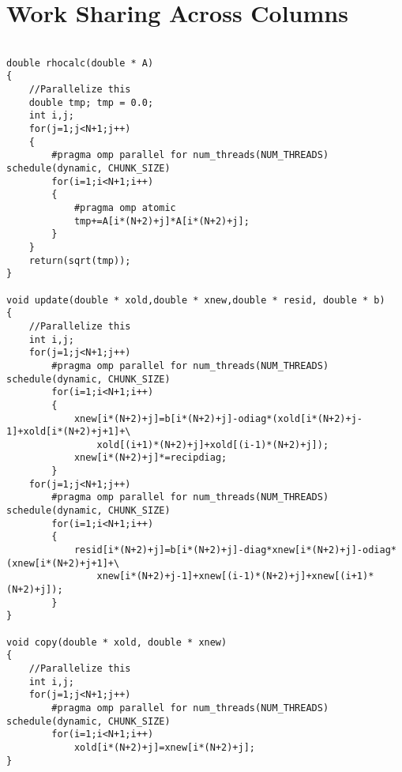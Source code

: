 \documentclass[11pt]{article}
\begin{document}
\section{Work Sharing Across Columns}
\begin{lstlisting}

double rhocalc(double * A)
{
	//Parallelize this
	double tmp;	tmp = 0.0;
	int i,j;
	for(j=1;j<N+1;j++)
	{ 
		#pragma omp parallel for num_threads(NUM_THREADS) schedule(dynamic, CHUNK_SIZE)
		for(i=1;i<N+1;i++)
		{	
			#pragma omp atomic
			tmp+=A[i*(N+2)+j]*A[i*(N+2)+j];
		}
	}
	return(sqrt(tmp));
}

void update(double * xold,double * xnew,double * resid, double * b)
{
	//Parallelize this
	int i,j;
	for(j=1;j<N+1;j++)
		#pragma omp parallel for num_threads(NUM_THREADS) schedule(dynamic, CHUNK_SIZE)
		for(i=1;i<N+1;i++)
		{
			xnew[i*(N+2)+j]=b[i*(N+2)+j]-odiag*(xold[i*(N+2)+j-1]+xold[i*(N+2)+j+1]+\
				xold[(i+1)*(N+2)+j]+xold[(i-1)*(N+2)+j]);
			xnew[i*(N+2)+j]*=recipdiag;
		}
	for(j=1;j<N+1;j++)
		#pragma omp parallel for num_threads(NUM_THREADS) schedule(dynamic, CHUNK_SIZE)
		for(i=1;i<N+1;i++)
		{
			resid[i*(N+2)+j]=b[i*(N+2)+j]-diag*xnew[i*(N+2)+j]-odiag*(xnew[i*(N+2)+j+1]+\
				xnew[i*(N+2)+j-1]+xnew[(i-1)*(N+2)+j]+xnew[(i+1)*(N+2)+j]);
		} 
} 
  
void copy(double * xold, double * xnew)
{
	//Parallelize this
	int i,j;
	for(j=1;j<N+1;j++)
		#pragma omp parallel for num_threads(NUM_THREADS) schedule(dynamic, CHUNK_SIZE)
		for(i=1;i<N+1;i++)
			xold[i*(N+2)+j]=xnew[i*(N+2)+j];
}
\end{lstlisting}
\end{document}
